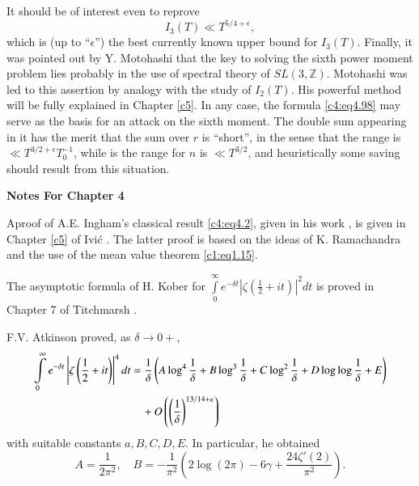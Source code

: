 It should be of interest even to reprove
$$
I_3 (T) \ll T^{5/4+ \epsilon},
$$
which is (up to ``$\epsilon$'') the best currently known upper bound
for $I_3 (T)$. Finally, it was pointed out by Y. Motohashi that the
key to solving the sixth power moment problem lies probably in the use
of spectral theory of $SL (3, \mathbb{Z})$. Motohashi was led to this
assertion by analogy with the study of $I_2 (T)$. His powerful method
will be fully explained in Chapter \ref{c5}. In any case, the formula
\eqref{c4:eq4.98} may serve as the basis for an attack on the sixth
moment. The double sum appearing in it has the merit that the sum over
$r$ is ``short'', in the sense that the range is $\ll T^{3/2 +
  \epsilon}T_0^{-1}$, while is the range for $n$ is $\ll T^{3/2}$, and
heuristically some saving should result from this situation.

\newpage

\begin{center}
  \textbf{\LARGE Notes For Chapter 4}
\end{center}

\bigskip

A\pageoriginale proof of A.E. Ingham's classical result
\eqref{c4:eq4.2}, given in his work \cite{Ingham1}, is given in Chapter \ref{c5} of
Ivi\'c \cite{Ivic1}. The latter proof is based on the ideas of
K. Ramachandra \cite{Ramachandra1} and the use of the mean value theorem
\eqref{c1:eq1.15}.

The asymptotic formula of H. Kober \cite{Kober1} for $\int\limits_0^\infty
e^{-\delta t} \left| \zeta (\frac{1}{2} + it)\right|^2 dt$ is proved
in Chapter 7 of Titchmarsh \cite{Titchmarsh1}.

F.V. Atkinson proved, as $\delta \to 0 +$,
{\fontsize{9pt}{11pt}\selectfont
\begin{align}
\int\limits_0^\infty e^{- \delta t} \left|\zeta \left(\frac{1}{2} + it\right)
\right|^4 dt
&= \frac{1}{\delta} \left(A \log^4 \frac{1}{\delta} + B
  \log^3 \frac{1}{\delta} + C \log^2 \frac{1}{\delta} + D \log \log
  \frac{1}{\delta} + E \right)\notag\\ 
&\quad + O \left( \left(\frac{1}{\delta}
    \right)^{13/14+\epsilon} \right)  \label{c4:eq4.99}
\end{align}}
with suitable constants $a, B, C, D, E$. In particular, he obtained
$$
A= \frac{1}{2\pi^2},\quad B=- \frac{1}{\pi^2} \left(2 \log (2\pi) - 6 \gamma +
\frac{24 \zeta' (2)}{\pi^2}\right).
$$

